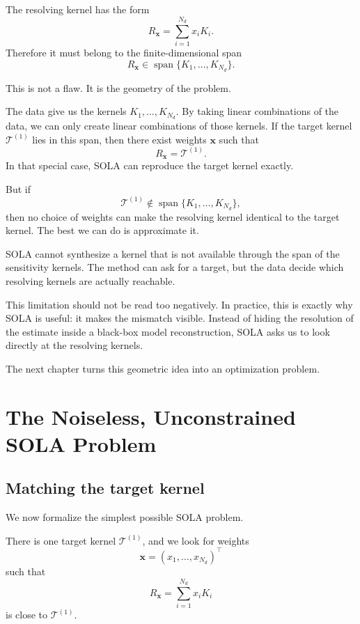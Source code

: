 \documentclass[11pt,openany]{book}
\theoremstyle{definition}
\theoremstyle{remark}
\newcommand{\Tau}{\mathcal{T}}
\newcommand{\spanop}{\operatorname{span}}
\begin{document}
The resolving kernel has the form
\[
  R_{\mathbf x}
  =
  \sum_{i=1}^{N_d}x_iK_i.
\]
Therefore it must belong to the finite-dimensional span
\[
  R_{\mathbf x}\in
  \spanop\{K_1,\dots,K_{N_d}\}.
\]

This is not a flaw. It is the geometry of the problem.

The data give us the kernels \(K_1,\dots,K_{N_d}\). By taking linear combinations of the data,
we can only create linear combinations of those kernels. If the target kernel \(\Tau^{(1)}\) lies in
this span, then there exist weights \(\mathbf x\) such that
\[
  R_{\mathbf x}=\Tau^{(1)}.
\]
In that special case, SOLA can reproduce the target kernel exactly.

But if
\[
  \Tau^{(1)}
  \notin
  \spanop\{K_1,\dots,K_{N_d}\},
\]
then no choice of weights can make the resolving kernel identical to the target kernel. The best
we can do is approximate it.

\begin{warningbox}
SOLA cannot synthesize a kernel that is not available through the span of the sensitivity kernels.
The method can ask for a target, but the data decide which resolving kernels are actually
reachable.
\end{warningbox}

This limitation should not be read too negatively. In practice, this is exactly why SOLA is useful:
it makes the mismatch visible. Instead of hiding the resolution of the estimate inside a black-box
model reconstruction, SOLA asks us to look directly at the resolving kernels.

The next chapter turns this geometric idea into an optimization problem.

\chapter{The Noiseless, Unconstrained SOLA Problem}

\section{Matching the target kernel}

We now formalize the simplest possible SOLA problem.

There is one target kernel \(\Tau^{(1)}\), and we look for weights
\[
  \mathbf x=(x_1,\dots,x_{N_d})^\top
\]
such that
\[
  R_{\mathbf x}
  =
  \sum_{i=1}^{N_d}x_iK_i
\]
is close to \(\Tau^{(1)}\).
\end{document}
